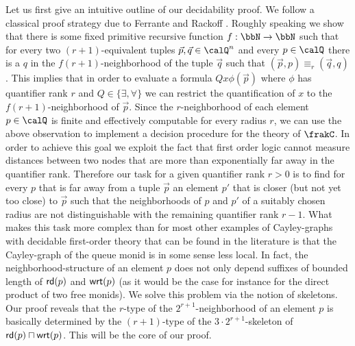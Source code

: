Let us first give an intuitive outline of our decidability proof. We follow a classical proof strategy due to Ferrante and Rackoff \cite{FerR79}. Roughly speaking  we show that there is some fixed primitive recursive function $f:\bbN \to \bbN$ such that for every
two $({r+1})$-equivalent tuples $\vec{p},\vec{q} \in \Qx^n$ and every $p\in \Qx$ there is a $q$ in the $f(r+1)$-neighborhood of the tuple $\vec{q}$ such that $(\vec{p},p) \equiv_r (\vec{q}, q)$.
This implies that in order to evaluate a formula $Qx\phi(\vec{p})$ where $\phi$ has quantifier rank $r$ and $Q\in\{\exists,\forall\}$  we can restrict the quantification of $x$ to the $f(r+1)$-neighborhood of $\vec{p}$. Since the
$r$-neighborhood of each element $p\in \Qx$ is finite and effectively computable for every radius $r$, we can use the above observation to implement a decision procedure for the theory of $\frakC$.   
In order to achieve this goal we exploit the fact that first order logic cannot measure distances between two nodes that are more than exponentially far away in the quantifier rank. Therefore our task for a given quantifier rank $r>0$ is to find for every $p$ that is far away from a tuple $\vec{p}$ an element $p'$ that is closer (but not yet too close) to $\vec{p}$ such that the neighborhoods of $p$ and $p'$ of a suitably chosen radius are not distinguishable with the remaining quantifier rank $r-1$. What makes this task more complex than for most other examples of Cayley-graphs with decidable first-order theory that can be found in the literature is that the Cayley-graph of the queue monid is in some sense less local.
In fact, the neighborhood-structure of an element $p$ does not only depend suffixes of  bounded length of $\mathsf{rd}(p)$ and $\mathsf{wrt}(p)$ (as it would be the case for instance for the direct product of two free monids). We solve this problem via the notion of skeletons. Our proof 
reveals that   the $r$-type of the $2^{r+1}$-neighborhood of an element $p$ is basically determined by the $(r+1)$-type of the $3\cdot 2^{r+1}$-skeleton of $\mathsf{rd}(p) \sqcap \mathsf{wrt}(p)$. This will be the core
of our proof.


